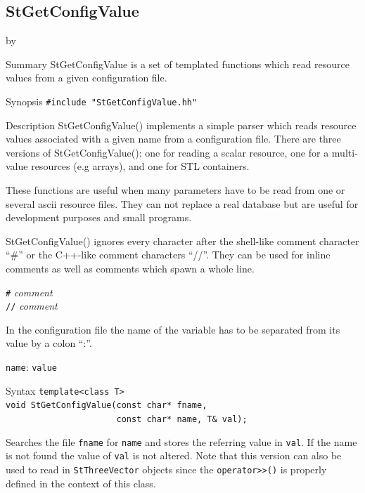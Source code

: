 \documentclass[twoside]{article}
\newcommand{\comp}[1]{\texttt{#1}}%
\newcommand{\args}[1]{\textit{#1}}%
\newcommand{\entrylabel}[1]{\mbox{\textbf{{#1}}}\hfil}%
\newenvironment{entry}
{\begin{list}{}%
    {\renewcommand{\makelabel}{\entrylabel}%
     \setlength{\labelwidth}{90pt}%
     \setlength{\leftmargin}{\labelwidth}
     \advance\leftmargin by \labelsep%
      }%
    }%
  {\end{list}}
\newcommand{\Entrylabel}[1]%
{\raisebox{0pt}[1ex][0pt]{\makebox[\labelwidth][l]%
    {\parbox[t]{\labelwidth}{\hspace{0pt}\textbf{{#1}}}}}}
\newenvironment{Entry}%
{\renewcommand{\entrylabel}{\Entrylabel}\begin{entry}}%
  {\end{entry}}
\begin{document}
\begin{description}
\subsection{StGetConfigValue }
\begin{Entry}
\item[Summary]
    StGetConfigValue is a set of templated functions which read
    resource values from a given configuration file.
    
\item[Synopsis]
    \verb+#include "StGetConfigValue.hh"+
    
  
\item[Description]
    StGetConfigValue() implements a simple parser which reads resource values associated
    with a given name from a configuration file.
    There are three versions of StGetConfigValue(): one for
    reading a scalar resource, one for a multi-value
    resources (e.g arrays), and one for STL containers. 

    These functions are useful when many parameters have to be read from
    one or several ascii resource files. They can not replace a real database but
    are useful for development purposes and small programs.

    StGetConfigValue() ignores every character after the shell-like comment character ``\#''
    or the C++-like comment characters ``//''. They can be used for inline comments
    as well as comments which spawn a whole line.
    
    \comp{\#} \args{comment}\\
    \comp{//} \args{comment}

    In the configuration file the name of the variable has to be separated from its value
    by a colon ``:''.
    
    \comp{name}: \comp{value}
    
\item[Syntax]
    \verb+template<class T>+\\
    \verb+void StGetConfigValue(const char* fname,+\\
    \verb+                      const char* name, T& val);+
    
    Searches the file \comp{fname} for \comp{name} and stores
    the referring value in \comp{val}. If the name is not found the value of
    \comp{val} is not altered. Note that this version can also be used to read in
    \comp{StThreeVector} objects since the \verb+operator>>()+ is properly defined in the
    context of this class.
        

\end{Entry}
\end{description}
\end{document}
